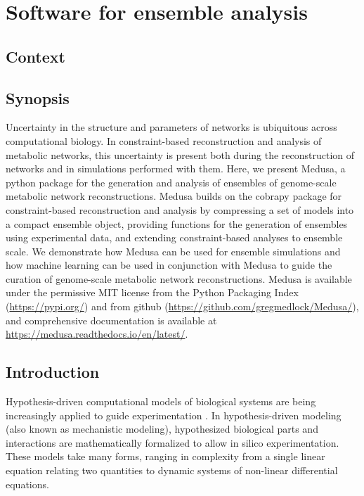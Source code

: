 \documentclass[11pt,twocolumn,notitlepage,openany,twoside]{book}
\begin{document}
\chapter{Software for ensemble analysis}
\begin{refsection}

\section{Context}

\section{Synopsis}

Uncertainty in the structure and parameters of networks is ubiquitous across computational biology. In constraint-based reconstruction and analysis of metabolic networks, this uncertainty is present both during the reconstruction of networks and in simulations performed with them. Here, we present Medusa, a python package for the generation and analysis of ensembles of genome-scale metabolic network reconstructions. Medusa builds on the cobrapy package for constraint-based reconstruction and analysis by compressing a set of models into a compact ensemble object, providing functions for the generation of ensembles using experimental data, and extending constraint-based analyses to ensemble scale. We demonstrate how Medusa can be used for ensemble simulations and how machine learning can be used in conjunction with Medusa to guide the curation of genome-scale metabolic network reconstructions. Medusa is available under the permissive MIT license from the Python Packaging Index (\url{https://pypi.org/}) and from github (\url{https://github.com/gregmedlock/Medusa/}), and comprehensive documentation is available at \url{https://medusa.readthedocs.io/en/latest/}.

\section{Introduction}

Hypothesis-driven computational models of biological systems are being increasingly applied to guide experimentation \cite{Kitano2002-az}. In hypothesis-driven modeling (also known as mechanistic modeling), hypothesized biological parts and interactions are mathematically formalized to allow in silico experimentation. These models take many forms, ranging in complexity from a single linear equation relating two quantities to dynamic systems of non-linear differential equations.


\end{refsection}
\end{document}
